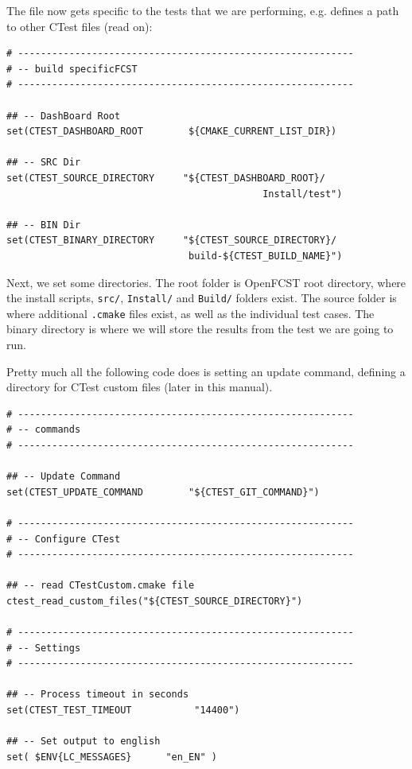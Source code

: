 The file now gets specific to the tests that we are performing, e.g. defines a path to other CTest files (read on):

\small \begin{lstlisting}
# -----------------------------------------------------------  
# -- build specificFCST
# -----------------------------------------------------------  

## -- DashBoard Root
set(CTEST_DASHBOARD_ROOT        ${CMAKE_CURRENT_LIST_DIR})

## -- SRC Dir
set(CTEST_SOURCE_DIRECTORY     "${CTEST_DASHBOARD_ROOT}/
                                             Install/test")

## -- BIN Dir                                            
set(CTEST_BINARY_DIRECTORY     "${CTEST_SOURCE_DIRECTORY}/
                                build-${CTEST_BUILD_NAME}")
\end{lstlisting}\normalsize

Next, we set some directories. The root folder is OpenFCST root directory, where the install scripts, \verb!src/!, \verb!Install/! and \verb!Build/! folders exist. The source folder is where additional \verb!.cmake! files exist, as well as the individual test cases. The binary directory is where we will store the results from the test we are going to run. 

Pretty much all the following code does is setting an update command, defining a directory for CTest custom files (later in this manual).

\small \begin{lstlisting}
# -----------------------------------------------------------  
# -- commands
# -----------------------------------------------------------  

## -- Update Command
set(CTEST_UPDATE_COMMAND        "${CTEST_GIT_COMMAND}")

# -----------------------------------------------------------  
# -- Configure CTest
# -----------------------------------------------------------  

## -- read CTestCustom.cmake file
ctest_read_custom_files("${CTEST_SOURCE_DIRECTORY}")

# -----------------------------------------------------------  
# -- Settings
# -----------------------------------------------------------  

## -- Process timeout in seconds
set(CTEST_TEST_TIMEOUT           "14400")

## -- Set output to english
set( $ENV{LC_MESSAGES}      "en_EN" )

\end{lstlisting}\normalsize

